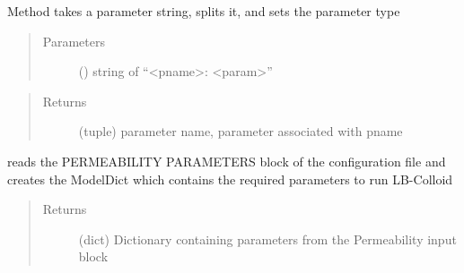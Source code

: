 \documentclass[letterpaper,10pt,english]{sphinxmanual}
\begin{document}
\begin{fulllineitems}
\begin{fulllineitems}
\begin{quote}
\begin{description}
\end{description}\end{quote}

\end{fulllineitems}


\begin{fulllineitems}
\label{\detokenize{index:lb_colloids.LB.LBIO.Config.parametertype}}
Method takes a parameter string, splits it, and sets the parameter type
\begin{quote}\begin{description}
\item[{Parameters}] \leavevmode
{} () \textendash{} string of “\textless{}pname\textgreater{}: \textless{}param\textgreater{}”

\end{description}\end{quote}
\begin{quote}\begin{description}
\item[{Returns}] \leavevmode
(tuple) parameter name, parameter associated with pname

\end{description}\end{quote}

\end{fulllineitems}


\begin{fulllineitems}
\label{\detokenize{index:lb_colloids.LB.LBIO.Config.permeability_parameters}}
reads the PERMEABILITY PARAMETERS block of the configuration file and creates
the ModelDict which contains the required parameters to run LB-Colloid
\begin{quote}\begin{description}
\item[{Returns}] \leavevmode
(dict) Dictionary containing parameters from the Permeability input block

\end{description}\end{quote}

\end{fulllineitems}


\end{fulllineitems}
\end{document}
